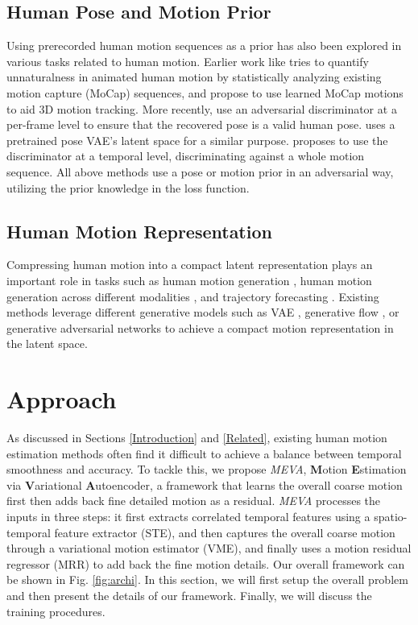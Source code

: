 \documentclass[runningheads]{llncs}
\begin{document}
\subsection{Human Pose and Motion Prior}
Using prerecorded human motion sequences as a prior has also been explored in various tasks related to human motion. Earlier work like \cite{Ren2005} tries to quantify unnaturalness in animated human motion by statistically analyzing existing motion capture (MoCap) sequences, and \cite{Urtasun2006,Ormoneit2001} propose to use learned MoCap motions to aid 3D motion tracking. More recently, \cite{hmr,hmmr} use an adversarial discriminator at a per-frame level to ensure that the recovered pose is a valid human pose. \cite{smplx} uses a pretrained pose VAE's latent space for a similar purpose. \cite{vibe} proposes to use the discriminator at a temporal level, discriminating against a whole motion sequence. All above methods use a pose or motion prior in an adversarial way, utilizing the prior knowledge in the loss function. 

\subsection{Human Motion Representation}
Compressing human motion into a compact latent representation plays an important role in tasks such as human motion generation \cite{Wang2019,Cai_2018_ECCV,Walker_2017_ICCV}, human motion generation across different modalities \cite{Plappert2018,Ahuja,Yamada2018,Xiaodong2019},  and trajectory forecasting \cite{Fragkiadaki2015,Yan2018,diverse,Butepage_2017_CVPR}. Existing methods leverage different generative models such as VAE \cite{Yan2018,diverse}, generative flow \cite{Prediction}, or generative adversarial networks  \cite{Wang2019} to achieve a compact motion representation in the latent space.


\section{Approach}
As discussed in Sections \ref{Introduction} and \ref{Related}, existing human motion estimation methods often find it difficult to achieve a balance between temporal smoothness and accuracy. To tackle this, we propose \textit{MEVA}, \textbf{M}otion \textbf{E}stimation via \textbf{V}ariational \textbf{A}utoencoder, a framework that learns the overall coarse motion first then adds back fine detailed motion as a residual. \textit{MEVA} processes the inputs in three steps: it first extracts correlated temporal features using a spatio-temporal feature extractor (STE), and then captures the overall coarse motion through a variational motion estimator (VME), and finally uses a motion residual regressor (MRR) to add back the fine motion details. Our overall framework can be shown in Fig. \ref{fig:archi}. In this section, we will first setup the overall problem and then present the details of our framework. Finally, we will discuss the training procedures. 
\end{document}
